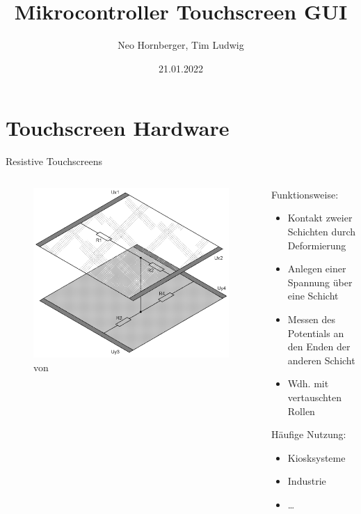 \documentclass[12pt, aspectratio=169]{beamer}
\title{Mikrocontroller Touchscreen GUI}
\author{Neo Hornberger, Tim Ludwig}
\date{21.01.2022}
\begin{document}
	\maketitle
	
	\section{Touchscreen Hardware}
	\frame{\tableofcontents[currentsection]}
	
	\begin{frame}{Resistive Touchscreens}
		\begin{columns}
			\begin{column}{0.4\textwidth}
				\begin{figure}
					\includegraphics[max width=.9\textwidth,max height=.9\textheight]{../Images/ResistiveTouchScreen.png}
					\caption*{\tiny von }
				\end{figure}
			\end{column}
			\begin{column}{0.6\textwidth}
				Funktionsweise: 
				\begin{itemize}
					\item<+-> Kontakt zweier Schichten durch Deformierung
					\item<+-> Anlegen einer Spannung über eine Schicht
					\item<+-> Messen des Potentials an den Enden der anderen Schicht
					\item<+-> Wdh. mit vertauschten Rollen
				\end{itemize}
				
				Häufige Nutzung:
				\begin{itemize}
					\item Kiosksysteme
					\item Industrie
					\item \dots
				\end{itemize}
			\end{column}
		\end{columns}
	\end{frame}
\end{document}
